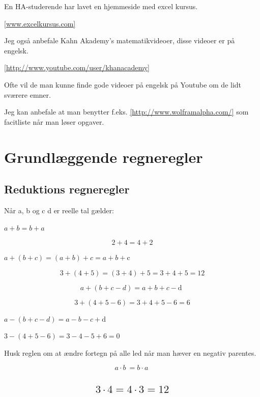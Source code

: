 \documentclass[]{book}
\begin{document}
En HA-studerende har lavet en hjemmeside med excel kursus.

\href{http://www.excelkursus.com/}{{[}www.excelkursus.com{]}}

Jeg også anbefale Kahn Akademy's matematikvideoer, disse videoer er på
engelsk.

\href{http://www.youtube.com/user/khanacademy}{{[}http://www.youtube.com/user/khanacademy{]}}

Ofte vil de man kunne finde gode videoer på engelsk på Youtube om de
lidt sværere emner.

Jeg kan anbefale at man benytter f.eks.
\href{http://www.wolframalpha.com/}{{[}http://www.wolframalpha.com/{]}}
som facitliste når man løser opgaver.

\hypertarget{grundlggende-regneregler}{%
\chapter{Grundlæggende regneregler}\label{grundlggende-regneregler}}

\hypertarget{reduktions-regneregler}{%
\section{Reduktions regneregler}\label{reduktions-regneregler}}

Når a, b og c d er reelle tal gælder:

\(a + b = b + a\)

\[2 + 4 = 4 + 2\]

\(a + (b + c) = (a + b) + c = a + b + \text{c\ }\)

\[3 + \left( 4 + 5 \right) = \left( 3 + 4 \right) + 5 = 3 + 4 + 5 = 12\]

\[a + \left( b + c - d \right) = a + b + c - \text{d\ }\]

\[3 + \left( 4 + 5 - 6 \right) = 3 + 4 + 5 - 6 = 6\]

\(a - \left( b + c - d \right) = a - b - c + \text{d\ }\)

\(3 - \left( 4 + 5 - 6 \right) = 3 - 4 - 5 + 6 = 0\)

Husk reglen om at ændre fortegn på alle led når man hæver en negativ
parentes.

\[a \cdot b\  = b \cdot a\ \]

\hypertarget{cdot-4-4-cdot-3-12}{%
\section{\texorpdfstring{\[3 \cdot 4 = 4 \cdot 3 = 12\]}{3 \textbackslash{}cdot 4 = 4 \textbackslash{}cdot 3 = 12}}\label{cdot-4-4-cdot-3-12}}
\end{document}
